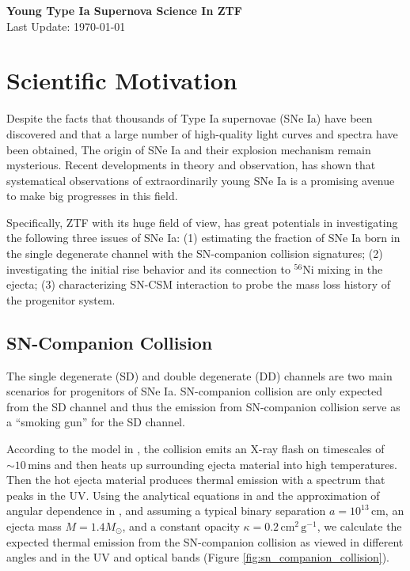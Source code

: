\documentclass[11pt]{article}
\begin{document}

\begin{center}
  \textbf{\Large Young Type Ia Supernova Science In ZTF}\\
  Last Update: \today
\end{center}


\section{Scientific Motivation}
\label{sec:scientific_motivation}

Despite the facts that thousands of Type Ia supernovae (SNe Ia) have
been discovered and that a large number of high-quality light curves
and spectra have been obtained, The origin of SNe Ia and their
explosion mechanism remain mysterious. Recent developments in theory
and observation, has shown that systematical observations of
extraordinarily young SNe Ia is a promising avenue to make big
progresses in this field.

Specifically, ZTF with its huge field of view, has great potentials in
investigating the following three issues of SNe Ia: (1) estimating the
fraction of SNe Ia born in the single degenerate channel with the
SN-companion collision signatures; (2) investigating the initial rise
behavior and its connection to $^{56}$Ni mixing in the ejecta; (3)
characterizing SN-CSM interaction to probe the mass loss history of
the progenitor system.

\subsection{SN-Companion Collision}
\label{sec:sn_companion_collision}

The single degenerate (SD) and double degenerate (DD) channels are two
main scenarios for progenitors of SNe Ia. SN-companion collision are
only expected from the SD channel and thus the emission from
SN-companion collision serve as a ``smoking gun'' for the SD channel.

According to the model in \citet{2010ApJ...708.1025K}, the collision
emits an X-ray flash on timescales of $\sim 10\,\textrm{mins}$ and
then heats up surrounding ejecta material into high temperatures. Then
the hot ejecta material produces thermal emission with a spectrum that
peaks in the UV. Using the analytical equations in
\citet{2010ApJ...708.1025K} and the approximation of angular
dependence in \citet{2012ApJ...749...18B}, and assuming a typical
binary separation $a=10^{13}\,\textrm{cm}$, an ejecta mass
$M=1.4M_\odot$, and a constant opacity
$\kappa=0.2\,\textrm{cm}^2\,\textrm{g}^{-1}$, we calculate the
expected thermal emission from the SN-companion collision as viewed in
different angles and in the UV and optical bands (Figure
\ref{fig:sn_companion_collision}).
\end{document}
